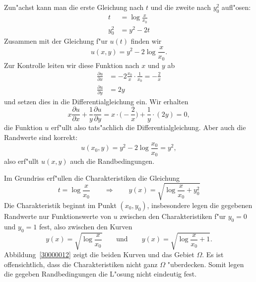 \begin{loesung}
\begin{teilaufgaben}
Zun"achst kann man die erste Gleichung nach $t$ und die zweite nach $y_0^2$
aufl"osen: 
\begin{align*}
t&=\log\frac{x}{x_0}\\
y_0^2&=y^2-2t
\end{align*}
Zusammen mit der Gleichung f"ur $u(t)$ finden wir
\[
u(x,y) = y^2 - 2\log\frac{x}{x_0}.
\]
Zur Kontrolle leiten wir diese Funktion nach $x$ und $y$ ab
\begin{align*}
\frac{\partial u}{\partial x}
&=
-2\frac{x_0}{x}\cdot\frac1{x_0}=-\frac2x
\\
\frac{\partial u}{\partial y}
&=
2y
\end{align*}
und setzen dies in die Differentialgleichung ein.
Wir erhalten
\[
x\frac{\partial u}{\partial x} + \frac1y\frac{\partial u}{\partial y}
=
x\cdot \biggl(-\frac{2}{x}\biggr)
+ \frac1y\cdot (2y)
=
0,
\]
die Funktion $u$ erf"ullt also tats"achlich die Differentialgleichung.
Aber auch die Randwerte sind korrekt:
\[
u(x_0,y)=y^2-2\log\frac{x_0}{x_0}=y^2,
\]
also erf"ullt $u(x,y)$ auch die Randbedingungen.
\item
Im Grundriss erf"ullen die Charakteristiken die Gleichung
\[
t = \log\frac{x}{x_0}
\qquad\Rightarrow\qquad
y(x)=\sqrt{\log\frac{x}{x_0}+y_0^2}
\]
Die Charakteristik beginnt im Punkt $(x_0,y_0)$, insbesondere legen die
gegebenen Randwerte nur Funktionswerte von $u$ zwischen den Charakteristiken
f"ur $y_0=0$ und $y_0=1$ fest, also zwischen den Kurven
\[
y(x) = \sqrt{\log\frac{x}{x_0}}
\qquad\text{und}\qquad
y(x) = \sqrt{\log\frac{x}{x_0}+1}.
\]
Abbildung~\ref{30000012} zeigt die beiden Kurven und das Gebiet $\Omega$.
Es ist offensichtlich, dass die Charakteristiken nicht ganz $\Omega$
"uberdecken.
Somit legen die gegeben Randbedingungen die L"osung nicht eindeutig fest.
\qedhere
\end{teilaufgaben}
\end{loesung}
